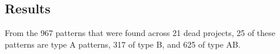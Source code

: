 \subsection{Results}
From the 967 patterns that were found across 21 dead projects, 25 of these
patterns are type A patterns, 317 of type B, and 625 of type AB.

